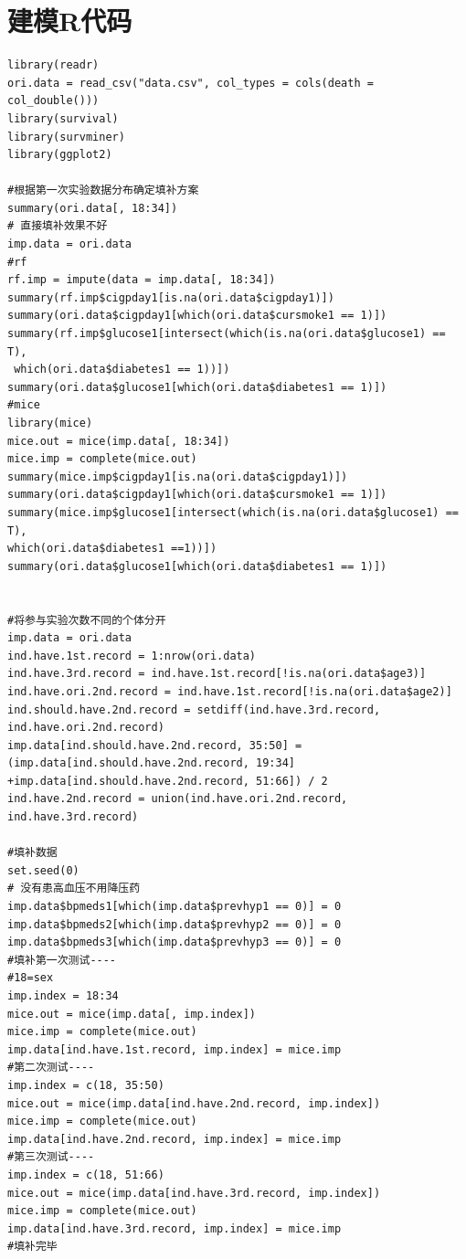 \documentclass[lang=cn,11pt,a4paper,cite=super,AutoFakeBold]{elegantpaper}
\begin{document}
\section{建模R代码}
\begin{lstlisting}[style=R]
library(readr)
ori.data = read_csv("data.csv", col_types = cols(death = col_double()))
library(survival)
library(survminer)
library(ggplot2)

#根据第一次实验数据分布确定填补方案
summary(ori.data[, 18:34])
# 直接填补效果不好
imp.data = ori.data
#rf
rf.imp = impute(data = imp.data[, 18:34])
summary(rf.imp$cigpday1[is.na(ori.data$cigpday1)])
summary(ori.data$cigpday1[which(ori.data$cursmoke1 == 1)])
summary(rf.imp$glucose1[intersect(which(is.na(ori.data$glucose1) == T),
 which(ori.data$diabetes1 == 1))])
summary(ori.data$glucose1[which(ori.data$diabetes1 == 1)])
#mice
library(mice)
mice.out = mice(imp.data[, 18:34])
mice.imp = complete(mice.out)
summary(mice.imp$cigpday1[is.na(ori.data$cigpday1)])
summary(ori.data$cigpday1[which(ori.data$cursmoke1 == 1)])
summary(mice.imp$glucose1[intersect(which(is.na(ori.data$glucose1) == T), 
which(ori.data$diabetes1 ==1))])
summary(ori.data$glucose1[which(ori.data$diabetes1 == 1)])


#将参与实验次数不同的个体分开
imp.data = ori.data
ind.have.1st.record = 1:nrow(ori.data)
ind.have.3rd.record = ind.have.1st.record[!is.na(ori.data$age3)]
ind.have.ori.2nd.record = ind.have.1st.record[!is.na(ori.data$age2)]
ind.should.have.2nd.record = setdiff(ind.have.3rd.record, ind.have.ori.2nd.record)
imp.data[ind.should.have.2nd.record, 35:50] = 
(imp.data[ind.should.have.2nd.record, 19:34] +imp.data[ind.should.have.2nd.record, 51:66]) / 2
ind.have.2nd.record = union(ind.have.ori.2nd.record, ind.have.3rd.record)

#填补数据
set.seed(0)
# 没有患高血压不用降压药
imp.data$bpmeds1[which(imp.data$prevhyp1 == 0)] = 0
imp.data$bpmeds2[which(imp.data$prevhyp2 == 0)] = 0
imp.data$bpmeds3[which(imp.data$prevhyp3 == 0)] = 0
#填补第一次测试----
#18=sex
imp.index = 18:34
mice.out = mice(imp.data[, imp.index])
mice.imp = complete(mice.out)
imp.data[ind.have.1st.record, imp.index] = mice.imp
#第二次测试----
imp.index = c(18, 35:50)
mice.out = mice(imp.data[ind.have.2nd.record, imp.index])
mice.imp = complete(mice.out)
imp.data[ind.have.2nd.record, imp.index] = mice.imp
#第三次测试----
imp.index = c(18, 51:66)
mice.out = mice(imp.data[ind.have.3rd.record, imp.index])
mice.imp = complete(mice.out)
imp.data[ind.have.3rd.record, imp.index] = mice.imp
#填补完毕



\end{lstlisting}
\end{document}
